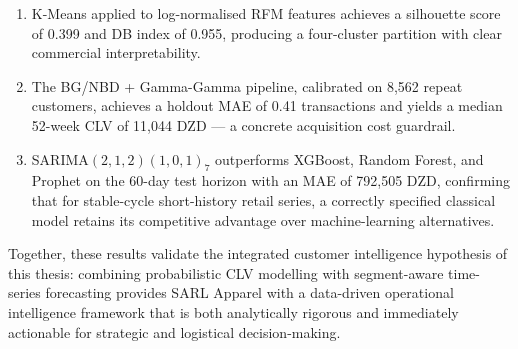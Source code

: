 \begin{enumerate}[noitemsep]
    \item K-Means applied to log-normalised RFM features achieves a silhouette score of 0.399 and DB index of 0.955, producing a four-cluster partition with clear commercial interpretability.
    \item The BG/NBD + Gamma-Gamma pipeline, calibrated on 8,562 repeat customers, achieves a holdout MAE of 0.41 transactions and yields a median 52-week CLV of 11,044 DZD — a concrete acquisition cost guardrail.
    \item SARIMA$(2,1,2)(1,0,1)_7$ outperforms XGBoost, Random Forest, and Prophet on the 60-day test horizon with an MAE of 792,505 DZD, confirming that for stable-cycle short-history retail series, a correctly specified classical model retains its competitive advantage over machine-learning alternatives.
\end{enumerate}

Together, these results validate the integrated customer intelligence hypothesis of this thesis: combining probabilistic CLV modelling with segment-aware time-series forecasting provides SARL Apparel with a data-driven operational intelligence framework that is both analytically rigorous and immediately actionable for strategic and logistical decision-making.
